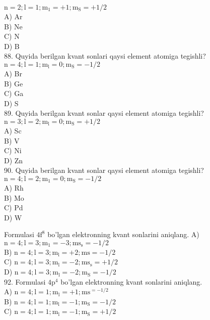 $\mathrm{n}=2 ; \mathrm{l}=1 ; \mathrm{m}_{1}=+1 ; \mathrm{m}_{\mathrm{S}}=+1 / 2$\\
A) Ar\\
B) Ne\\
C) N\\
D) B\\
88. Quyida berilgan kvant sonlari qaysi element atomiga tegishli?\\
$\mathrm{n}=4 ; \mathrm{l}=1 ; \mathrm{m}_{\mathrm{l}}=0 ; \mathrm{m}_{\mathrm{S}}=-1 / 2$\\
A) Br\\
B) Ge\\
C) Ga\\
D) S\\
89. Quyida berilgan kvant sonlar qaysi element atomiga tegishli?\\
$\mathrm{n}=3 ; \mathrm{l}=2 ; \mathrm{m}_{\mathrm{l}}=0 ; \mathrm{m}_{\mathrm{S}}=+1 / 2$\\
A) Sc\\
B) V\\
C) Ni\\
D) Zn\\
90. Quyida berilgan kvant sonlar qaysi element atomiga tegishli?\\
$\mathrm{n}=4 ; \mathrm{l}=2 ; \mathrm{m}_{1}=0 ; \mathrm{m}_{\mathrm{S}}=-1 / 2$\\
A) Rh\\
B) Mo\\
C) Pd\\
D) W
  \item Formulasi $4 \mathrm{f}^{8}$ bo'lgan elektronning kvant sonlarini aniqlang.
A) $\mathrm{n}=4 ; \mathrm{l}=3 ; \mathrm{m}_{1}=-3 ; \mathrm{ms}_{\mathrm{s}}=-1 / 2$\\
B) $\mathrm{n}=4 ; \mathrm{l}=3 ; \mathrm{m}_{\mathrm{l}}=+2 ; \mathrm{ms}=-1 / 2$\\
C) $\mathrm{n}=4 ; \mathrm{l}=3 ; \mathrm{m}_{\mathrm{l}}=-2 ; \mathrm{ms}_{\mathrm{s}}=+1 / 2$\\
D) $\mathrm{n}=4 ; \mathrm{l}=3 ; \mathrm{m}_{\mathrm{l}}=-2 ; \mathrm{m}_{\mathrm{S}}=-1 / 2$\\
92. Formulasi $4 \mathrm{p}^{4}$ bo'lgan elektronning kvant sonlarini aniqlang.\\
A) $\mathrm{n}=4 ; \mathrm{l}=1 ; \mathrm{m}_{\mathrm{l}}=+1 ; \mathrm{ms}^{=-1 / 2}$\\
B) $\mathrm{n}=4 ; \mathrm{l}=1 ; \mathrm{m}_{\mathrm{l}}=-1 ; \mathrm{m}_{\mathrm{S}}=-1 / 2$\\
C) $\mathrm{n}=4 ; \mathrm{l}=1 ; \mathrm{m}_{\mathrm{l}}=-1 ; \mathrm{m}_{\mathrm{S}}=+1 / 2$\\
